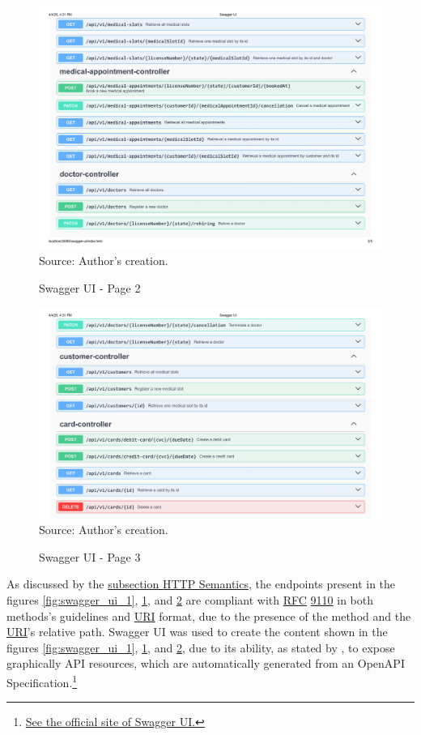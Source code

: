 \begin{landscape}
    \begin{figure}[H]
        \centering
        \caption{Swagger UI - Page 2}
        \includegraphics[width=0.83\linewidth]{figures/Swagger UI-2.png}
        \label{fig:swagger_ui_2}
        \\ \footnotesize Source: Author's creation.
    \end{figure}
\end{landscape}

\begin{landscape}
    \begin{figure}[H]
        \centering
        \caption{Swagger UI - Page 3}
        \includegraphics[width=0.83\linewidth]{figures/Swagger UI-3.png}
        \label{fig:swagger_ui_3}
        \\ \footnotesize Source: Author's creation.
    \end{figure}
\end{landscape}


As discussed by the \hyperref[subsection:http_semantics]{subsection HTTP Semantics}, the endpoints present in the figures \ref{fig:swagger_ui_1}, 
\ref{fig:swagger_ui_2}, and \ref{fig:swagger_ui_3} are compliant with \hyperref[appendix:glossary]{RFC} \href{https://www.rfc-editor.org/rfc/rfc9110.html}{9110} in both methods's guidelines and \hyperref[appendix:glossary]{URI} format, due to the presence of the method and the \hyperref[appendix:glossary]{URI}'s relative path. Swagger UI was used to create the content shown in the figures \ref{fig:swagger_ui_1}, \ref{fig:swagger_ui_2}, and \ref{fig:swagger_ui_3}, due to its ability, as stated by \cite{mcnamara2022flexible}, to expose graphically API resources, which are automatically generated from an OpenAPI Specification.\footnote{\href{https://swagger.io/tools/swagger-ui/}{See the official site of Swagger UI.}}

